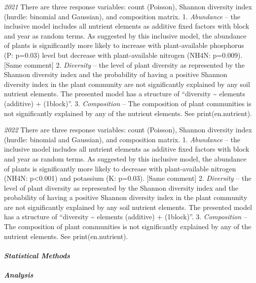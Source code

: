 \documentclass[
]{article}
\begin{document}
\emph{2021} There are three response variables: count (Poisson), Shannon
diversity index (hurdle: binomial and Gaussian), and composition matrix.
1. \emph{Abundance} -- the inclusive model includes all nutrient
elements as additive fixed factors with block and year as random terms.
As suggested by this inclusive model, the abundance of plants is
significantly more likely to increase with plant-available phosphorus
(P: p=0.03) level but decrease with plant-available nitrogen (NH4N:
p=0.009). {[}Same comment{]} 2. \emph{Diversity} -- the level of plant
diversity as represented by the Shannon diversity index and the
probability of having a positive Shannon diversity index in the plant
community are not significantly explained by any soil nutrient elements.
The presented model has a structure of ``diversity \textasciitilde{}
elements (additive) + (1\textbar block)''. 3. \emph{Composition} -- The
composition of plant communities is not significantly explained by any
of the nutrient elements. See print(en.nutrient).

\emph{2022} There are three response variables: count (Poisson), Shannon
diversity index (hurdle: binomial and Gaussian), and composition matrix.
1. \emph{Abundance} -- the inclusive model includes all nutrient
elements as additive fixed factors with block and year as random terms.
As suggested by this inclusive model, the abundance of plants is
significantly more likely to decrease with plant-available nitrogen
(NH4N: p\textless0.001) and potassium (K: p=0.03). {[}Same comment{]} 2.
\emph{Diversity} -- the level of plant diversity as represented by the
Shannon diversity index and the probability of having a positive Shannon
diversity index in the plant community are not significantly explained
by any soil nutrient elements. The presented model has a structure of
``diversity \textasciitilde{} elements (additive) + (1\textbar block)''.
3. \emph{Composition} -- The composition of plant communities is not
significantly explained by any of the nutrient elements. See
print(en.nutrient).

\hypertarget{statistical-methods-1}{%
\paragraph{\texorpdfstring{\emph{Statistical Methods}
}{Statistical Methods  }}\label{statistical-methods-1}}

\hypertarget{analysis-1}{%
\paragraph{\texorpdfstring{\emph{Analysis}}{Analysis }}\label{analysis-1}}
\end{document}
